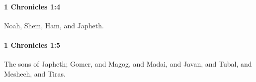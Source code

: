 		\paragraph{1 Chronicles 1:4} %
			\label{1CHRONICLES-1-4}

			Noah, Shem, Ham, and Japheth.


		\paragraph{1 Chronicles 1:5} %
			\label{1CHRONICLES-1-5}

			The sons of Japheth; Gomer, and Magog, and Madai, and Javan, and Tubal, and Meshech, and Tiras.



